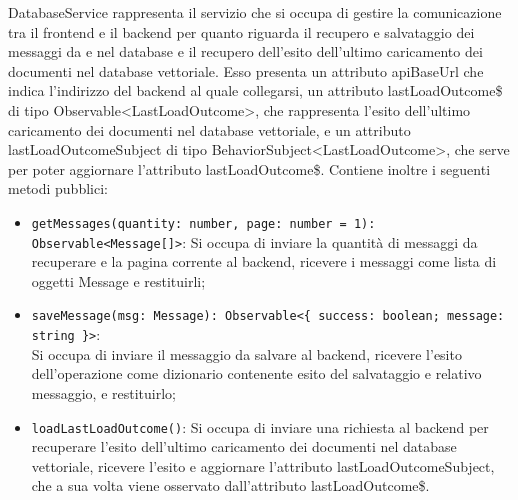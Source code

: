 \label{sec:database_service}
DatabaseService rappresenta il servizio che si occupa di gestire la comunicazione tra il frontend e il backend per quanto riguarda il recupero e salvataggio dei messaggi da e nel database e il recupero dell'esito dell'ultimo caricamento dei documenti nel database vettoriale. Esso presenta un attributo apiBaseUrl che indica l'indirizzo del backend al quale collegarsi, un attributo lastLoadOutcome\$ di tipo Observable<LastLoadOutcome>, che rappresenta l'esito dell'ultimo caricamento dei documenti nel database vettoriale, e un attributo lastLoadOutcomeSubject di tipo BehaviorSubject<LastLoadOutcome>, che serve per poter aggiornare l'attributo lastLoadOutcome\$.
Contiene inoltre i seguenti metodi pubblici:
\begin{itemize}
    \item \texttt{getMessages(quantity: number, page: number = 1): Observable<Message[]>}: Si occupa di inviare la quantità di messaggi da recuperare e la pagina corrente al backend, ricevere i messaggi come lista di oggetti Message e restituirli;
    \item \texttt{saveMessage(msg: Message): Observable<\{ success: boolean; message: string \}>}:\\ Si occupa di inviare il messaggio da salvare al backend, ricevere l'esito dell'operazione come dizionario contenente esito del salvataggio e relativo messaggio, e restituirlo;
    \item \texttt{loadLastLoadOutcome()}: Si occupa di inviare una richiesta al backend per recuperare l'esito dell'ultimo caricamento dei documenti nel database vettoriale, ricevere l'esito e aggiornare l'attributo lastLoadOutcomeSubject, che a sua volta viene osservato dall'attributo lastLoadOutcome\$.
\end{itemize}
